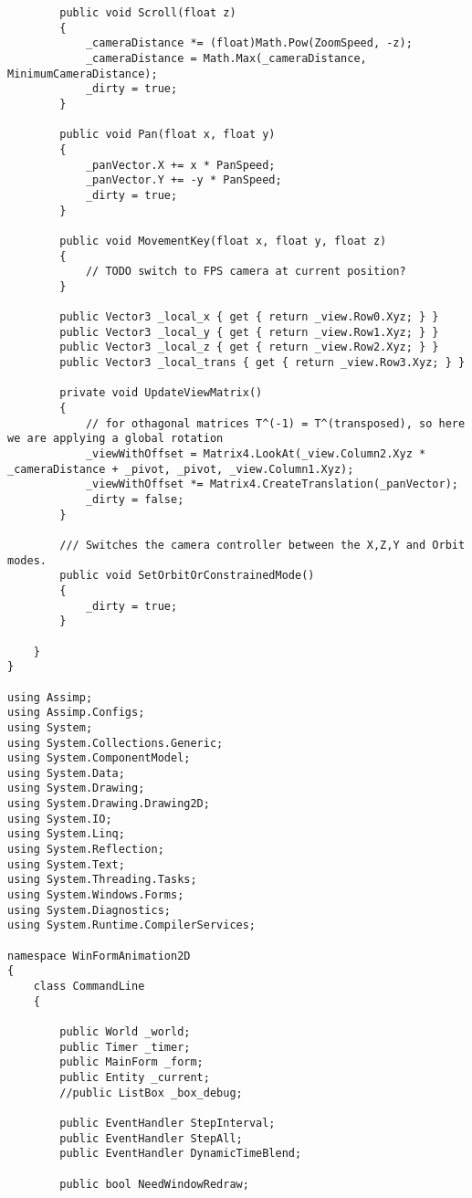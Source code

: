 \begin{scriptsize}
\begin{verbatim}
        public void Scroll(float z)
        {
            _cameraDistance *= (float)Math.Pow(ZoomSpeed, -z);
            _cameraDistance = Math.Max(_cameraDistance, MinimumCameraDistance);
            _dirty = true;
        }

        public void Pan(float x, float y)
        {
            _panVector.X += x * PanSpeed;
            _panVector.Y += -y * PanSpeed;
            _dirty = true;
        }

        public void MovementKey(float x, float y, float z)
        {
            // TODO switch to FPS camera at current position?
        }

        public Vector3 _local_x { get { return _view.Row0.Xyz; } }
        public Vector3 _local_y { get { return _view.Row1.Xyz; } }
        public Vector3 _local_z { get { return _view.Row2.Xyz; } }
        public Vector3 _local_trans { get { return _view.Row3.Xyz; } }

        private void UpdateViewMatrix()
        {
            // for othagonal matrices T^(-1) = T^(transposed), so here we are applying a global rotation
            _viewWithOffset = Matrix4.LookAt(_view.Column2.Xyz * _cameraDistance + _pivot, _pivot, _view.Column1.Xyz);
            _viewWithOffset *= Matrix4.CreateTranslation(_panVector);
            _dirty = false;
        }

        /// Switches the camera controller between the X,Z,Y and Orbit modes.
        public void SetOrbitOrConstrainedMode()
        {
            _dirty = true;
        }

    }
}

using Assimp;
using Assimp.Configs;
using System;
using System.Collections.Generic;
using System.ComponentModel;
using System.Data;
using System.Drawing;
using System.Drawing.Drawing2D;
using System.IO;
using System.Linq;
using System.Reflection;
using System.Text;
using System.Threading.Tasks;
using System.Windows.Forms;
using System.Diagnostics;
using System.Runtime.CompilerServices;

namespace WinFormAnimation2D
{
    class CommandLine
    {

        public World _world;
        public Timer _timer;
        public MainForm _form;
        public Entity _current;
        //public ListBox _box_debug;

        public EventHandler StepInterval;
        public EventHandler StepAll;
        public EventHandler DynamicTimeBlend;

        public bool NeedWindowRedraw;


\end{verbatim}
\end{scriptsize}
